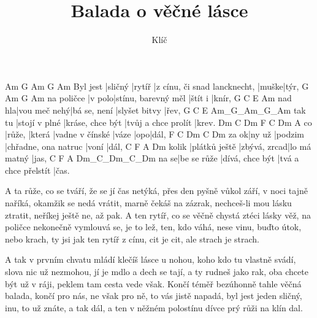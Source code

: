 \documentclass{song}
\title{Balada o věčné lásce}
\author{Klíč}
\begin{document}
\strophe
         Am      G      Am                           G     Am
Byl jest |sličný |rytíř |z cínu, či snad lancknecht, |muške|týr,
           G      Am                  G       Am
na poličce |v polo|stínu, barevný měl |štít i |knír,
       G            C            E             Am
nad hla|vou meč nehý|bá se, není |slyšet bitvy |řev,
       G             C                E                   Am_G_Am_G_Am
tak tu |stojí v plné |kráse, chce být |tvůj a chce prolít |krev.
     Dm     C      Dm              F     C   Dm
A co |růže, |která |vadne v čínské |váze |opo|dál,
     F      C       Dm                   C     Dm
za ok|ny už |podzim |chřadne, ona natruc |voní |dál,
      C             F            A            Dm
kolik |plátků ještě |zbývá, zrcad|lo má matný |jas,
     C           F               A                    Dm_C_Dm_C_Dm
na se|be se růže |dívá, chce být |tvá a chce přelstít |čas.
\endstrophe

\strophe*
A ta růže, co se tváří, že se jí čas netýká,
přes den pyšně vůkol září, v noci tajně naříká,
okamžik se nedá vrátit, marně čekáš na zázrak,
nechceš-li mou lásku ztratit, neříkej ještě ne, až pak.
A ten rytíř, co se věčně chystá ztéci lásky věž,
na poličce nekonečně vymlouvá se, je to lež,
ten, kdo váhá, nese vinu, buďto útok, nebo krach,
ty jsi jak ten rytíř z cínu, cit je cit, ale strach je strach.
\endstrophe

\strophe*
A tak v prvním chvatu mládí klečíš lásce u nohou,
koho kdo tu vlastně svádí, slova nic už nezmohou,
jí je mdlo a dech se tají, a ty rudneš jako rak,
oba chcete být už v ráji, peklem tam cesta vede však.
Končí téměř bezúhonně tahle věčná balada,
končí pro nás, ne však pro ně, to vás jistě napadá,
byl jest jeden sličný, inu, to už znáte, a tak dál,
a ten v něžném polostínu dívce prý růži na klín dal.
\endstrophe
\end{document}
